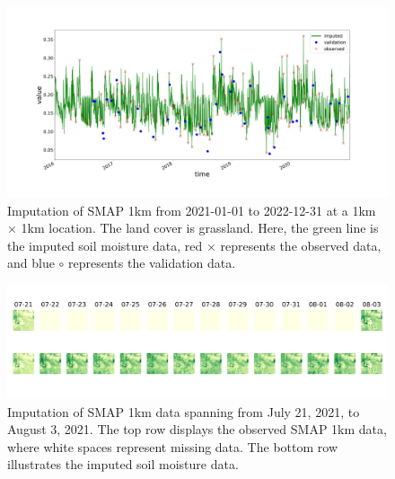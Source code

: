 \documentclass[review]{elsarticle}
\begin{document}
\begin{figure}
\centering
\includegraphics[width=\textwidth]{figure/smap_1km.png}
\caption{Imputation of SMAP 1km from 2021-01-01 to 2022-12-31 at a 1km $\times$ 1km location. The land cover is grassland. Here, the green line is the imputed soil moisture data, red $\times$ represents the observed data, and blue $\circ$ represents the validation data.}
\label{fig: imputation_result}
\end{figure}

\begin{figure}[H]
\centering
\includegraphics[width=\textwidth]{figure/missing_at_time_points_smap.png}
\caption{Imputation of SMAP 1km data spanning from July 21, 2021, to August 3, 2021. The top row displays the observed SMAP 1km data, where white spaces represent missing data. The bottom row illustrates the imputed soil moisture data.}
\label{fig: missing_at_time_points_smap} 
\end{figure}
\end{document}
